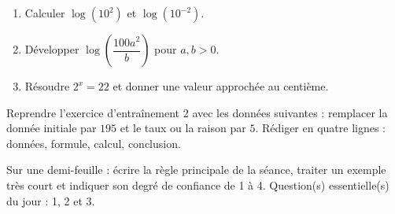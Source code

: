 \begin{exercice}[-- essentiel]
\begin{enumerate}\item Calculer $\log(10^2)$ et $\log(10^{-2})$.\item Développer $\log\!\left(\dfrac{100a^2}{b}\right)$ pour $a,b>0$.\item Résoudre $2^x=22$ et donner une valeur approchée au centième.\end{enumerate}
\end{exercice}


\begin{dm}Reprendre l'exercice d'entraînement 2 avec les données suivantes : remplacer la donnée initiale par $195$ et le taux ou la raison par $5$. Rédiger en quatre lignes : données, formule, calcul, conclusion.\end{dm}

\begin{sortie}Sur une demi-feuille : écrire la règle principale de la séance, traiter un exemple très court et indiquer son degré de confiance de 1 à 4. Question(s) essentielle(s) du jour : 1, 2 et 3.\end{sortie}

